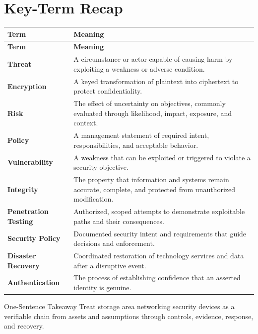 \documentclass[11pt,letterpaper]{article}
\begin{document}
\section*{Key-Term Recap}
\begin{longtable}{>{\raggedright\arraybackslash}p{}>{\raggedright\arraybackslash}p{}}
\toprule\rowcolor{Navy}\color{white}\textbf{Term} & \color{white}\textbf{Meaning}\\\midrule
\endfirsthead
\toprule\rowcolor{Navy}\color{white}\textbf{Term} & \color{white}\textbf{Meaning}\\\midrule
\endhead
\textbf{Threat} & A circumstance or actor capable of causing harm by exploiting a weakness or adverse condition. \\\midrule
\textbf{Encryption} & A keyed transformation of plaintext into ciphertext to protect confidentiality. \\\midrule
\textbf{Risk} & The effect of uncertainty on objectives, commonly evaluated through likelihood, impact, exposure, and context. \\\midrule
\textbf{Policy} & A management statement of required intent, responsibilities, and acceptable behavior. \\\midrule
\textbf{Vulnerability} & A weakness that can be exploited or triggered to violate a security objective. \\\midrule
\textbf{Integrity} & The property that information and systems remain accurate, complete, and protected from unauthorized modification. \\\midrule
\textbf{Penetration Testing} & Authorized, scoped attempts to demonstrate exploitable paths and their consequences. \\\midrule
\textbf{Security Policy} & Documented security intent and requirements that guide decisions and enforcement. \\\midrule
\textbf{Disaster Recovery} & Coordinated restoration of technology services and data after a disruptive event. \\\midrule
\textbf{Authentication} & The process of establishing confidence that an asserted identity is genuine. \\\midrule
\bottomrule
\end{longtable}
\begin{CornellExamBox}{One-Sentence Takeaway}
Treat storage area networking security devices as a verifiable chain from assets and assumptions through controls, evidence, response, and recovery.
\end{CornellExamBox}
\end{document}
